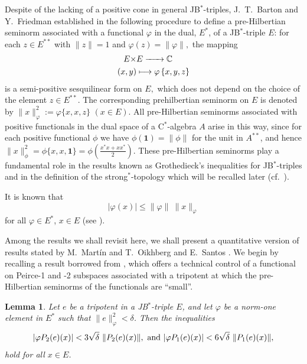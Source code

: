 \documentclass[10pt]{amsart}
\newtheorem{lemma}[theorem]{Lemma}
\def\J#1#2#3{ \left\{ #1,#2,#3 \right\} }
\begin{document}
	Despite of the lacking of a positive cone in general JB$^*$-triples, J.~T.~Barton and Y.~Friedman established in \cite[Proposition 1.2]{BarFri1987Grothendieck} the following procedure to define a pre-Hilbertian seminorm associated with a functional $\varphi$ in the dual, $E^*$, of a JB$^*$-triple $E$: for each $z\in E^{**}$ with $\|z\| =1$ and $\varphi (z)=\|\varphi\|,$ the mapping $$\begin{aligned} E\times & E \xrightarrow{\hspace*{0.59161cm}}  \mathbb{C} \\
		(x,y)&\longmapsto {\varphi} \J xyz
	\end{aligned}$$ is a semi-positive sesquilinear form on $E,$ which does not depend on the choice of the element $z\in E^{**}$. The corresponding prehilbertian seminorm on $E$ is denoted by  $\|x\|_{{\varphi}}^2 := \varphi \{x,x,z\}$ $(x\in E)$. All pre-Hilbertian seminorms associated with positive functionals in the dual space of a C$^*$-algebra $A$ arise in this way, since for each positive functional $\phi$ we have $\phi(\mathbf{1})=\|\phi\|$ for the unit in $A^{**}$, and hence $\|x\|_{\phi}^2 = \phi \{x,x,\mathbf{1}\} = \phi (\frac{x^* x + x x^* }{2})$. These pre-Hilbertian seminorms play a fundamental role in the results known as Grothedieck's inequalities for JB$^*$-triples and in the definition of the strong$^*$-topology which will be recalled later (cf.\ \cite{BarFri90, HamKalPePfi20Groth}).
	
	It is known that
	$$|\varphi (x)| \leq \|\varphi\| \ \|x\|_{\varphi}$$ for all $\varphi\in E^*$, $x\in E$ (see \cite[comments before Definition 3.1]{BarFri90}).
	
	Among the results we shall revisit here, we shall present a quantitative version of results stated by M.~Mart{\'i}n and T.~Oikhberg \cite[Lemma 4.16]{MarOikh2004} and E.~Santos \cite[Lemma 3.3]{Santos2014}. We begin by recalling a result borrowed from \cite{FerPe06}, which offers a technical control of a functional on Peirce-1 and -2 subspaces associated with a tripotent at which the pre-Hilbertian seminorms of the functionals are ``small''.
	
	\begin{lemma}\label{l tecnical seminorm}{\rm\cite[Lemma 3.2]{FerPe06}} Let $e$ be a tripotent in a JB$^*$-triple $E$, and let $\varphi$ be a norm-one element in $E^{*}$ such that $\|e\|_{\varphi}^2 < \delta$. Then the inequalities $$ |\varphi P_2 (e) (x)| < 3 \sqrt{\delta} \ \|P_2 (e)
		(x)\|, \hbox{ and } |\varphi P_1 (e) (x)| < 6 \sqrt{\delta} \ \|P_1 (e)
		(x)\|,$$ hold for all $x\in E$.
	\end{lemma}
	
\end{document}
